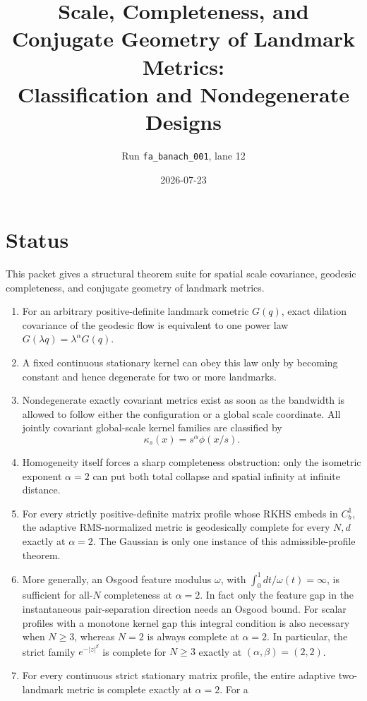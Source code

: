 \documentclass[11pt]{article}
\title{Scale, Completeness, and Conjugate Geometry of Landmark Metrics:\\
Classification and Nondegenerate Designs}
\author{Run \texttt{fa\_banach\_001}, lane 12}
\date{2026-07-23}
\begin{document}
\maketitle

\section*{Status}

This packet gives a structural theorem suite for spatial scale covariance,
geodesic completeness, and conjugate geometry of landmark metrics.
\begin{enumerate}
\item For an arbitrary positive-definite landmark cometric \(G(q)\), exact
  dilation covariance of the geodesic flow is equivalent to one power law
  \(G(\lambda q)=\lambda^\alpha G(q)\).
\item A fixed continuous stationary kernel can obey this law only by becoming
  constant and hence degenerate for two or more landmarks.
\item Nondegenerate exactly covariant metrics exist as soon as the bandwidth
  is allowed to follow either the configuration or a global scale coordinate.
  All jointly covariant global-scale kernel families are classified by
  \[
    \kappa_s(x)=s^\alpha\phi(x/s).
  \]
\item Homogeneity itself forces a sharp completeness obstruction: only the
  isometric exponent \(\alpha=2\) can put both total collapse and spatial
  infinity at infinite distance.
\item For every strictly positive-definite matrix profile whose RKHS embeds
  in \(C_b^1\), the adaptive RMS-normalized metric is geodesically complete
  for every \(N,d\) exactly at \(\alpha=2\).  The Gaussian is only one
  instance of this admissible-profile theorem.
\item More generally, an Osgood feature modulus
  \(\omega\), with \(\int_{0}^{1}dt/\omega(t)=\infty\), is sufficient for
  all-\(N\) completeness at \(\alpha=2\).  In fact only the feature gap in
  the instantaneous pair-separation direction needs an Osgood bound.
  For scalar profiles with a
  monotone kernel gap this integral condition is also necessary when
  \(N\ge3\), whereas \(N=2\) is always complete at \(\alpha=2\).  In
  particular, the strict family \(e^{-|z|^\beta}\) is complete for
  \(N\ge3\) exactly at \((\alpha,\beta)=(2,2)\).
\item For every continuous strict stationary matrix profile, the entire
  adaptive two-landmark metric is complete exactly at \(\alpha=2\).  For a

\end{enumerate}
\end{document}
